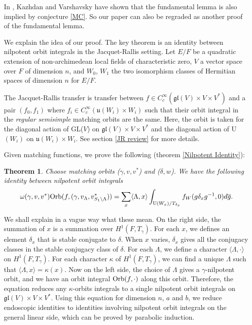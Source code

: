 \documentclass[11pt, oneside,reqno]{amsart}   	%
\newtheorem{theorem}{Theorem}[section]
\begin{document}
In \cite{Kazhdan}, Kazhdan and Varshavsky have shown that the fundamental lemma is also implied by conjecture \ref{MC}. So our paper can also be regraded as another proof of the fundamental lemma. 

\bigbreak

We explain the idea of our proof. The key theorem is an identity between nilpotent orbit integrals in the Jacquet-Rallis setting. Let $E/F$ be a quadratic extension of non-archimedean local fields of characteristic zero, $V$ a vector space over $F$ of dimension $n$, and $W_0$, $W_1$ the two isomorphism classes of Hermitian spaces of dimension $n$ for $E/F$.

The Jacquet-Rallis transfer is transfer between $f \in C_c^\infty(\mathfrak{gl}(V)\times V \times V^*)$ and a pair $(f_0, f_1)$ where $f_i \in C_c^\infty(\mathfrak{u}(W_i) \times W_i)$ such that their orbit integral in the \textit{regular semisimple} matching orbits are the same. Here, the orbit is taken for the diagonal action of GL($V$) on $\mathfrak{gl}(V)\times V \times V^*$ and the diagonal action of U$(W_i)$ on $\mathfrak{u}(W_i) \times W_i$. See section \ref{JR review} for more details.

Given matching functions, we prove the following (theorem \ref{Nilpotent Identity}):

\begin{theorem} \label{XY}
 Choose matching orbits \textup{(}$\gamma,v, v^*$\textup{)} and \textup{(}$\delta,w$\textup{)}. We have the following identity between nilpotent orbit integrals
\begin{equation}
\omega(\gamma,v, v^*) \textup{Orb}(f,(\gamma,v_{\Lambda},v^*_{S_1 \backslash \Lambda}))= \sum_x \langle \Lambda,x \rangle \int_{\textup{U}(W_x)/T_{\delta_x}}f_W(g\delta_x g^{-1},0)d\overline{g}.
\end{equation}
\end{theorem}

We shall explain in a vague way what these mean. On the right side, the summation of $x$ is a summation over $H^1(F,T_\gamma)$. For each $x$, we defines an element $\delta_x$ that is stable conjugate to $\delta$. When $x$ varies, $\delta_x$ gives all the conjugacy classes in the stable conjugacy class of $\delta$. For each $\Lambda$, we define a character $\langle \Lambda, \cdot \rangle$ on $H^1(F,T_\gamma)$. For each character $\kappa$ of $H^1(F,T_\gamma)$, we can find a unique $\Lambda$ such that $\langle \Lambda, x \rangle=\kappa(x)$. Now on the left side, the choice of $\Lambda$ gives a $\gamma$-nilpotent orbit, and we have an orbit integral $\textup{Orb}(f, \cdot )$ along this orbit.
Therefore, the equation reduces any $\kappa$-orbits integrals to a single nilpotent orbit integrals on $\mathfrak{gl}(V)\times V \times V^*$. Using this equation for dimension $n$, $a$ and $b$, we reduce endoscopic identities to identities involving nilpotent orbit integrals on the general linear side, which can be proved by parabolic induction.
\end{document}
